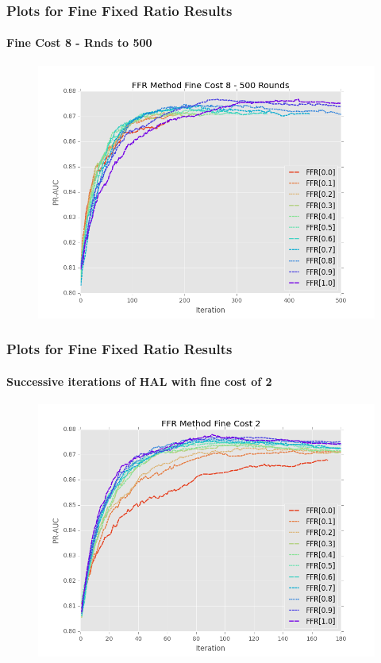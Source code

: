 \documentclass{beamer}
\begin{document}
\begin{frame}[noframenumbering]
    \frametitle{Plots for Fine Fixed Ratio Results}  %
    \framesubtitle{Fine Cost 8 - Rnds to 500}
    \begin{figure}[!htb]
        \centering
        \includegraphics[width=0.8\columnwidth]{fig/ParamsFFR_PR_Cost8_rnds0_500}
        \label{fig:ParamsFFR_PR_Cost8_rnds0_500}
    \end{figure}
\end{frame}
\begin{frame}[noframenumbering]
    \frametitle{Plots for Fine Fixed Ratio Results}  %
    \framesubtitle{Successive iterations of HAL with fine cost of 2}
    \begin{figure}[!htb]
        \centering
        \includegraphics[width=0.8\columnwidth]{fig/ParamsFFR_PR_Cost2_rnds0_180}
        \label{fig:ParamsFFR_PR_Cost2_rnds0_180}
    \end{figure}
\end{frame}
\end{document}
